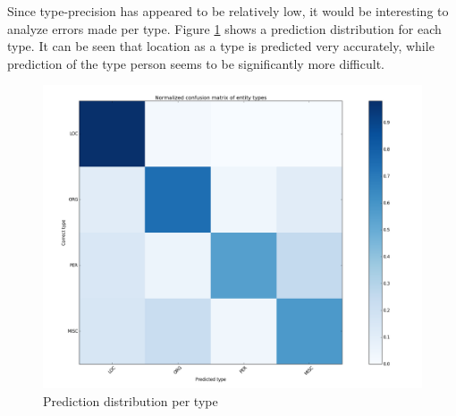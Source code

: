 Since type-precision has appeared to be relatively low, it would be interesting to analyze errors made per type. Figure \ref{fig:confusion} shows a prediction distribution for each type.
It can be seen that location as a type is predicted very accurately, while prediction of the type person seems to be significantly more difficult.

\begin{figure}
    \centering
    \includegraphics[scale=0.4]{fig/confusion_matrix_reclassified}
    \caption{Prediction distribution per type}
    \label{fig:confusion}
\end{figure}
